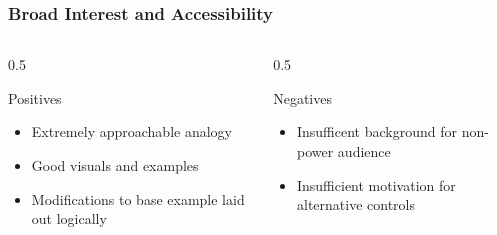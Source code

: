 \documentclass[
    aspectratio=169,
    \ifdefined\HANDOUT
    handout
    \else
    \fi
]{beamer}
\begin{document}
\begin{frame}
    \frametitle{Broad Interest and Accessibility}
    \begin{columns}
        \begin{column}{0.5\textwidth}
            \begin{block}{Positives}
                \begin{itemize}
                    \item Extremely approachable analogy
                    \item Good visuals and examples
                    \item Modifications to base example laid out logically
                \end{itemize}
            \end{block}
        \end{column}
        \begin{column}{0.5\textwidth}
            \begin{block}{Negatives}
                \begin{itemize}
                    \item Insufficent background for non-power audience
                    \item Insufficient motivation for alternative controls
                \end{itemize}
            \end{block}
        \end{column}
    \end{columns}
\end{frame}
\end{document}

